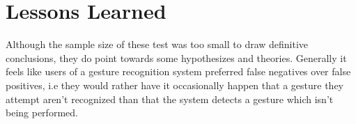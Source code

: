

\section{Lessons Learned}

Although the sample size of these test was too small to draw definitive conclusions, they do point towards some hypothesizes and theories. 
Generally it feels like users of a gesture recognition system preferred false negatives over false positives, i.e they would rather have it occasionally
happen that a gesture they attempt aren't recognized than that the system detects a gesture which isn't being performed.






% 

